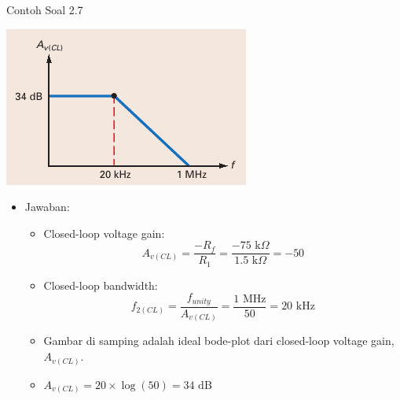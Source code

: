 \begin{frame}{Contoh Soal 2.7}
	\begin{multicols}{2}
		\begin{center}
			\includegraphics[width=0.7\linewidth]{gambar/fig-16.16b}
		\end{center}
		\columnbreak
		\begin{itemize}
			\item Jawaban:
			\begin{itemize}
				\item Closed-loop voltage gain:
				\[ A_{v(CL)} = \frac{-R_f}{R_1} = \frac{-75 \text{ k}\Omega}{1.5 \text{ k}\Omega} = -50\]
				\item Closed-loop bandwidth:
				\[ f_{2(CL)} = \frac{f_{unity}}{A_{v(CL)}} = \frac{1 \text{ MHz}}{50} = 20 \text{ kHz}\]
				\item Gambar di samping adalah ideal bode-plot dari closed-loop voltage gain, $ A_{v(CL)} $.
				\item $ A_{v(CL)} = 20 \times \log(50) = 34 \text{ dB} $
			\end{itemize}
		\end{itemize}
	\end{multicols}
\end{frame}


